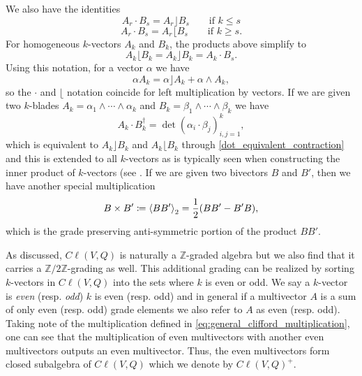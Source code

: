 We also have the identities
\begin{equation}
\label{eq:left_contraction_dot}
A_r \cdot B_s = A_r \rfloor B_s \qquad \textrm{if $k\leq s$}
\end{equation}
\begin{equation}
\label{eq:right_contraction_dot}
A_r \cdot B_s = A_r \lfloor B_s \qquad \textrm{if $k\geq s$}.
\end{equation}
For homogeneous $k$-vectors $A_k$ and $B_k$, the products above simplify to 
\begin{equation}
\label{dot_equivalent_contraction}
    A_k \lfloor B_k = A_k \rfloor B_k = A_k \cdot B_s.
\end{equation}
Using this notation, for a vector $\alpha$ we have
\begin{equation}
\alpha A_k = \alpha \rfloor A_k + \alpha \wedge A_k,
\end{equation}
so the $\cdot$ and $\lfloor$ notation coincide for left multiplication by vectors. If we are given two $k$-blades $A_k = \alpha_1 \wedge \cdots \wedge \alpha_k$ and $B_k = \beta_1 \wedge \cdots \wedge \beta_k$ we have 
\begin{equation}
\label{eq:dot_product}
A_k \cdot B_k^\dagger = \det(\alpha_i \cdot \beta_j )_{i,j=1}^k,
\end{equation}
which is equivalent to $A_k \rfloor B_k$ and $A_k \lfloor B_k$ through \ref{dot_equivalent_contraction} and this is extended to all $k$-vectors as is typically seen when constructing the inner product of $k$-vectors (see \cite{hestenes_clifford_1986}. If we are given two bivectors $B$ and $B'$, then we have another special multiplication
\begin{equation}
\label{eq:bivector_product}
B\times B' \coloneqq \proj{2}{BB'} = \frac{1}{2} (BB' - B'B),
\end{equation}
which is the grade preserving anti-symmetric portion of the product $BB'$.

As discussed, $C\ell(V,Q)$ is naturally a $\mathbb{Z}$-graded algebra but we also find that it carries a $\mathbb{Z}/2\mathbb{Z}$-grading as well. This additional grading can be realized by sorting $k$-vectors in $C\ell(V,Q)$ into the sets where $k$ is even or odd.  We say a $k$-vector is \emph{even} (resp. \emph{odd}) $k$ is even (resp. odd) and in general if a multivector $A$ is a sum of only even (resp. odd) grade elements we also refer to $A$ as even (resp. odd).  Taking note of the multiplication defined in \ref{eq:general_clifford_multiplication}, one can see that the multiplication of even multivectors with another even multivectors outputs an even multivector.  Thus, the even multivectors form closed subalgebra of $C\ell(V,Q)$ which we denote by $C\ell(V,Q)^+$.

